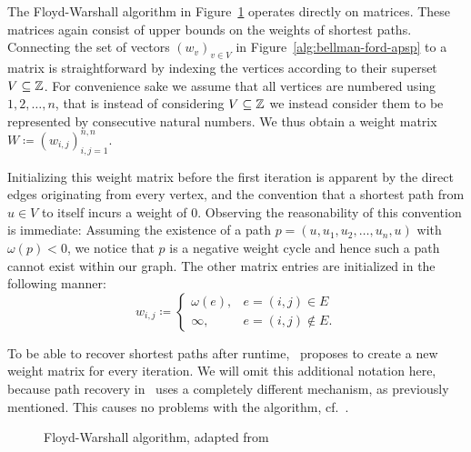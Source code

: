 The Floyd-Warshall algorithm in Figure~\ref{alg:floyd-warshall} operates directly on matrices.
These matrices again consist of upper bounds on the weights of shortest paths.
Connecting the set of vectors ${(w_v)}_{v \in V}$ in Figure~\ref{alg:bellman-ford-apsp} to a matrix is straightforward by indexing the vertices according to their superset $V \subseteq \mathbb{Z}$.
For convenience sake we assume that all vertices are numbered using $1, 2, \dots, n$, that is instead of considering $V \subseteq \mathbb{Z}$ we instead consider them to be represented by consecutive natural numbers.
We thus obtain a weight matrix $W \coloneqq {(w_{i, j})}_{i, j = 1}^{n, n}$.

Initializing this weight matrix before the first iteration is apparent by the direct edges originating from every vertex, and the convention that a shortest path from $u \in V$ to itself incurs a weight of $0$.
Observing the reasonability of this convention is immediate: Assuming the existence of a path $p = (u, u_1, u_2, \dots, u_n, u)$ with $\omega(p) < 0$, we notice that $p$ is a negative weight cycle and hence such a path cannot exist within our graph.
The other matrix entries are initialized in the following manner:
\[
    w_{i, j} \coloneqq \begin{cases}
        \omega(e), & e = (i, j) \in E \\
        \infty, & e = (i, j) \not\in E.
    \end{cases}
\]

To be able to recover shortest paths after runtime,\ \cite[Chapter~25]{Cormen2001} proposes to create a new weight matrix for every iteration.
We will omit this additional notation here, because path recovery in~\cite{Chan2007} uses a completely different mechanism, as previously mentioned.
This causes no problems with the algorithm, cf.~\cite[Exercise~25.4-5]{Cormen2001}.

\begin{figure}[ht]
    \centering
    \begin{minipage}{.6\textwidth}
        \begin{algorithm}[H]
        \end{algorithm}
    \end{minipage}
    \caption{Floyd-Warshall algorithm, adapted from~\cite[Chapter~25]{Cormen2001}\label{alg:floyd-warshall}}
\end{figure}

